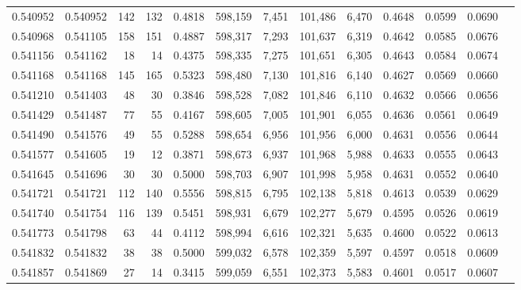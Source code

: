 \begin{tabular}{rrrrrrrrrrrrr}
0.540952 & 0.540952 &   142 &   132 &                                     0.4818 & 598,159 &   7,451 & 101,486 &   6,470 & 0.4648 & 0.0599 & 0.0690 \\
0.540968 & 0.541105 &   158 &   151 &                                     0.4887 & 598,317 &   7,293 & 101,637 &   6,319 & 0.4642 & 0.0585 & 0.0676 \\
0.541156 & 0.541162 &    18 &    14 &                                     0.4375 & 598,335 &   7,275 & 101,651 &   6,305 & 0.4643 & 0.0584 & 0.0674 \\
0.541168 & 0.541168 &   145 &   165 &                                     0.5323 & 598,480 &   7,130 & 101,816 &   6,140 & 0.4627 & 0.0569 & 0.0660 \\
0.541210 & 0.541403 &    48 &    30 &                                     0.3846 & 598,528 &   7,082 & 101,846 &   6,110 & 0.4632 & 0.0566 & 0.0656 \\
0.541429 & 0.541487 &    77 &    55 &                                     0.4167 & 598,605 &   7,005 & 101,901 &   6,055 & 0.4636 & 0.0561 & 0.0649 \\
0.541490 & 0.541576 &    49 &    55 &                                     0.5288 & 598,654 &   6,956 & 101,956 &   6,000 & 0.4631 & 0.0556 & 0.0644 \\
0.541577 & 0.541605 &    19 &    12 &                                     0.3871 & 598,673 &   6,937 & 101,968 &   5,988 & 0.4633 & 0.0555 & 0.0643 \\
0.541645 & 0.541696 &    30 &    30 &                                     0.5000 & 598,703 &   6,907 & 101,998 &   5,958 & 0.4631 & 0.0552 & 0.0640 \\
0.541721 & 0.541721 &   112 &   140 &                                     0.5556 & 598,815 &   6,795 & 102,138 &   5,818 & 0.4613 & 0.0539 & 0.0629 \\
0.541740 & 0.541754 &   116 &   139 &                                     0.5451 & 598,931 &   6,679 & 102,277 &   5,679 & 0.4595 & 0.0526 & 0.0619 \\
0.541773 & 0.541798 &    63 &    44 &                                     0.4112 & 598,994 &   6,616 & 102,321 &   5,635 & 0.4600 & 0.0522 & 0.0613 \\
0.541832 & 0.541832 &    38 &    38 &                                     0.5000 & 599,032 &   6,578 & 102,359 &   5,597 & 0.4597 & 0.0518 & 0.0609 \\
0.541857 & 0.541869 &    27 &    14 &                                     0.3415 & 599,059 &   6,551 & 102,373 &   5,583 & 0.4601 & 0.0517 & 0.0607 \\

\end{tabular}
